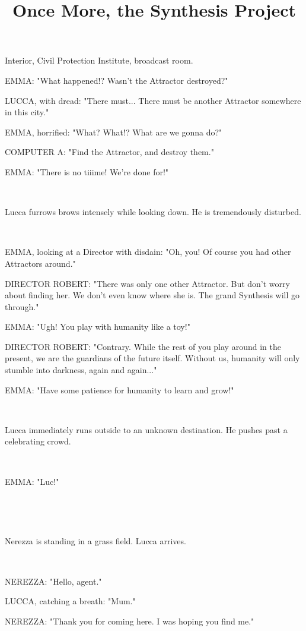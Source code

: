 \documentclass[11pt]{article}
\begin{document}
\ttfamily
\title{Once More, the Synthesis Project}
\maketitle



Interior, Civil Protection Institute, broadcast room. 

EMMA: "What happened!?
Wasn't the Attractor destroyed?"

LUCCA, with dread: "There must...
There must be another Attractor somewhere in this city."

EMMA, horrified: "What? What!? What are we gonna do?"

COMPUTER A: "Find the Attractor, and destroy them."

EMMA: "There is no tiiime! We're done for!"

\ 

Lucca furrows brows intensely while looking down. 
He is tremendously disturbed.

\ 

EMMA, looking at a Director with disdain: "Oh, you! 
Of course you had other Attractors around."

DIRECTOR ROBERT: "There was only one other Attractor. 
But don't worry about finding her. 
We don't even know where she is.
The grand Synthesis will go through."

EMMA: "Ugh! You play with humanity like a toy!"

DIRECTOR ROBERT: "Contrary. 
While the rest of you play around in the present, we are the guardians of the future itself.
Without us, humanity will only stumble into darkness, again and again..."

EMMA: "Have some patience for humanity to learn and grow!"

\ 

Lucca immediately runs outside to an unknown destination.
He pushes past a celebrating crowd.

\ 

EMMA: "Luc!"

\ 

\ 

Nerezza is standing in a grass field.
Lucca arrives. 

\ 

NEREZZA: "Hello, agent."

LUCCA, catching a breath: "Mum."

NEREZZA: "Thank you for coming here. 
I was hoping you find me."
\end{document}
